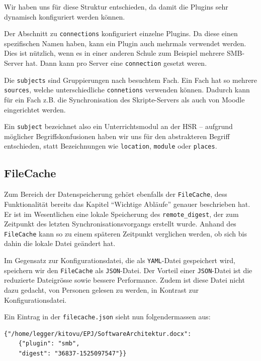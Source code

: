 \documentclass[a4paper]{article}
\begin{document}
Wir haben uns für diese Struktur entschieden, da damit die Plugins sehr dynamisch konfiguriert werden können.

Der Abschnitt zu \verb|connections| konfiguriert einzelne Plugins.
Da diese einen spezifischen Namen haben, kann ein Plugin auch mehrmals verwendet werden.
Dies ist nützlich, wenn es in einer anderen Schule zum Beispiel mehrere SMB-Server hat.
Dann kann pro Server eine \verb|connection| gesetzt weren.

Die \verb|subjects| sind Gruppierungen nach besuchtem Fach.
Ein Fach hat so mehrere \verb|sources|, welche unterschiedliche \verb|connetions| verwenden können.
Dadurch kann für ein Fach z.B. die Synchronisation des Skripte-Servers als auch von Moodle eingerichtet werden.

Ein \verb|subject| bezeichnet also ein Unterrichtsmodul an der HSR -- aufgrund möglicher Begriffskonfusionen haben wir uns für den abstrakteren Begriff entschieden, statt Bezeichnungen wie \verb|location|, \verb|module| oder \verb|places|.

\pagebreak

\subsection{FileCache}

Zum Bereich der Datenspeicherung gehört ebenfalls der \verb|FileCache|, dess Funktionalität bereits das Kapitel ``Wichtige Abläufe'' genauer beschrieben hat. Er ist im Wesentlichen eine lokale Speicherung des \verb|remote_digest|, der zum Zeitpunkt des letzten Synchronisationsvorgangs erstellt wurde. Anhand des \verb|FileCache| kann so zu einem späteren Zeitpunkt verglichen werden, ob sich bis dahin die lokale Datei geändert hat.

Im Gegensatz zur Konfigurationsdatei, die als \verb|YAML|-Datei gespeichert wird, speichern wir den \verb|FileCache| als \verb|JSON|-Datei. Der Vorteil einer \verb|JSON|-Datei ist die reduzierte Dateigrösse sowie bessere Performance. Zudem ist diese Datei nicht dazu gedacht, von Personen gelesen zu werden, in Kontrast zur Konfigurationsdatei.

Ein Eintrag in der \verb|filecache.json| sieht nun folgendermassen aus:

\begin{verbatim}
{"/home/legger/kitovu/EPJ/SoftwareArchitektur.docx": 
	{"plugin": "smb", 
	"digest": "36837-1525097547"}}
\end{verbatim}
\end{document}
